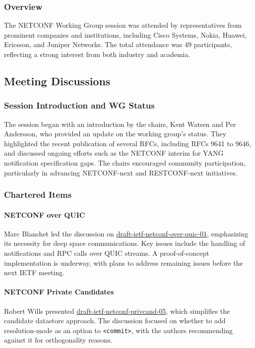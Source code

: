 \documentclass{article}
\begin{document}
\subsubsection{Overview}
The NETCONF Working Group session was attended by representatives from prominent companies and institutions, including Cisco Systems, Nokia, Huawei, Ericsson, and Juniper Networks. The total attendance was 49 participants, reflecting a strong interest from both industry and academia.

\subsection{Meeting Discussions}
\subsubsection{Session Introduction and WG Status}
The session began with an introduction by the chairs, Kent Watsen and Per Andersson, who provided an update on the working group's status. They highlighted the recent publication of several RFCs, including RFCs 9641 to 9646, and discussed ongoing efforts such as the NETCONF interim for YANG notification specification gaps. The chairs encouraged community participation, particularly in advancing NETCONF-next and RESTCONF-next initiatives.

\subsubsection{Chartered Items}
\paragraph{NETCONF over QUIC}
Marc Blanchet led the discussion on \href{https://datatracker.ietf.org/doc/html/draft-ietf-netconf-over-quic-01}{draft-ietf-netconf-over-quic-01}, emphasizing its necessity for deep space communications. Key issues include the handling of notifications and RPC calls over QUIC streams. A proof-of-concept implementation is underway, with plans to address remaining issues before the next IETF meeting.

\paragraph{NETCONF Private Candidates}
Robert Wills presented \href{https://datatracker.ietf.org/doc/html/draft-ietf-netconf-privcand-05}{draft-ietf-netconf-privcand-05}, which simplifies the candidate datastore approach. The discussion focused on whether to add resolution-mode as an option to \texttt{<commit>}, with the authors recommending against it for orthogonality reasons.
\end{document}

